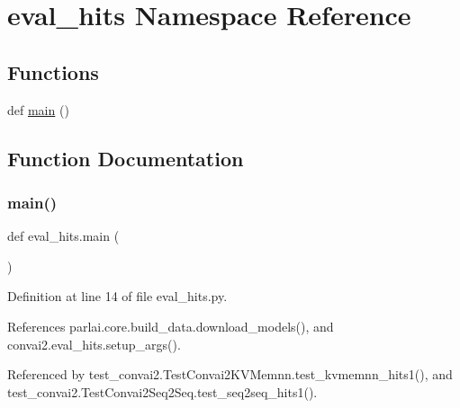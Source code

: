 \hypertarget{namespaceeval__hits}{}\section{eval\+\_\+hits Namespace Reference}
\label{namespaceeval__hits}
\subsection*{Functions}
\begin{DoxyCompactItemize}
\item 
def \hyperlink{namespaceeval__hits_aa050a80858eb66747f1674101554cd1b}{main} ()
\end{DoxyCompactItemize}


\subsection{Function Documentation}
\mbox{\label{namespaceeval__hits_aa050a80858eb66747f1674101554cd1b}} 
\subsubsection{\texorpdfstring{main()}{main()}}
{\footnotesize\ttfamily def eval\+\_\+hits.\+main (\begin{DoxyParamCaption}{ }\end{DoxyParamCaption})}



Definition at line 14 of file eval\+\_\+hits.\+py.



References parlai.\+core.\+build\+\_\+data.\+download\+\_\+models(), and convai2.\+eval\+\_\+hits.\+setup\+\_\+args().



Referenced by test\+\_\+convai2.\+Test\+Convai2\+K\+V\+Memnn.\+test\+\_\+kvmemnn\+\_\+hits1(), and test\+\_\+convai2.\+Test\+Convai2\+Seq2\+Seq.\+test\+\_\+seq2seq\+\_\+hits1().

